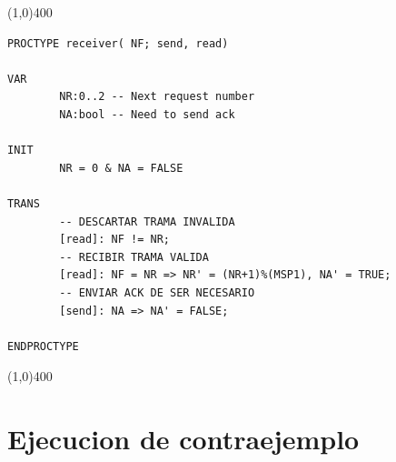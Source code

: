\documentclass[titlepage, 12pt]{book}
\begin{document}
\noindent \line(1,0){400}
\begin{verbatim}
PROCTYPE receiver( NF; send, read)

VAR
        NR:0..2 -- Next request number
        NA:bool -- Need to send ack

INIT
        NR = 0 & NA = FALSE

TRANS
        -- DESCARTAR TRAMA INVALIDA
        [read]: NF != NR;
        -- RECIBIR TRAMA VALIDA
        [read]: NF = NR => NR' = (NR+1)%(MSP1), NA' = TRUE;
        -- ENVIAR ACK DE SER NECESARIO
        [send]: NA => NA' = FALSE;

ENDPROCTYPE
\end{verbatim}
\noindent \line(1,0){400}

\section*{Ejecucion de contraejemplo}
\end{document}
